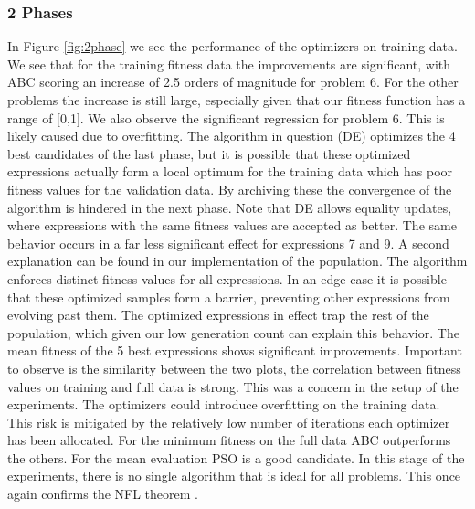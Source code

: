 \subsubsection{2 Phases}
In Figure \ref{fig:2phase} we see the performance of the optimizers on training data. 
We see that for the training fitness data the improvements are significant, with ABC scoring an increase of 2.5 orders of magnitude for problem 6. For the other problems the increase is still large, especially given that our fitness function has a range of [0,1].
We also observe the significant regression for problem 6. This is likely caused due to overfitting. The algorithm in question (DE) optimizes the 4 best candidates of the last phase, but it is possible that these optimized expressions actually form a local optimum for the training data which has poor fitness values for the validation data. By archiving these the convergence of the algorithm is hindered in the next phase. Note that DE allows equality updates, where expressions with the same fitness values are accepted as better. The same behavior occurs in a far less significant effect for expressions 7 and 9. A second explanation can be found in our implementation of the population. The algorithm enforces distinct fitness values for all expressions. In an edge case it is possible that these optimized samples form a barrier, preventing other expressions from evolving past them. The optimized expressions in effect trap the rest of the population, which given our low generation count can explain this behavior. The mean fitness of the 5 best expressions shows significant improvements. Important to observe is the similarity between the two plots, the correlation between fitness values on training and full data is strong. This was a concern in the setup of the experiments. The optimizers could introduce overfitting on the training data. This risk is mitigated by the relatively low number of iterations each optimizer has been allocated. For the minimum fitness on the full data ABC outperforms the others. For the mean evaluation PSO is a good candidate. In this stage of the experiments, there is no single algorithm that is ideal for all problems. This once again confirms the NFL theorem \cite{NFL}.
